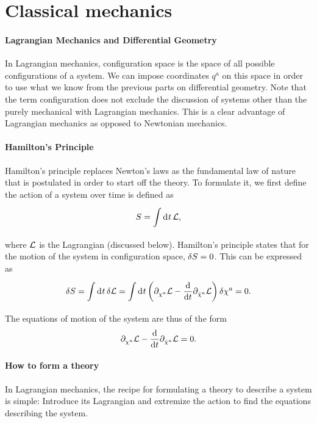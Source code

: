 \section{Classical mechanics}

\paragraph{Lagrangian Mechanics and Differential Geometry}
In Lagrangian mechanics, configuration space is the space of all possible configurations of a system. We can impose coordinates $q^{a}$ on this space in order to use what we know from the previous parts on differential geometry. Note that the term configuration does not exclude the discussion of systems other than the purely mechanical with Lagrangian mechanics. This is a clear advantage of Lagrangian mechanics as opposed to Newtonian mechanics.

\paragraph{Hamilton's Principle}
Hamilton's principle replaces Newton's laws as the fundamental law of nature that is postulated in order to start off the theory. To formulate it, we first define the action of a system over time is defined as
\begin{align*}
	S = \int\limits_{}^{}\dd[]{t}\mathcal{L},
\end{align*}
where $\mathcal{L}$ is the Lagrangian (discussed below). Hamilton's principle states that for the motion of the system in configuration space, $\delta S = 0$. This can be expressed as
\begin{align*}
	\delta S = \int\limits_{}^{}\dd[]{t}\delta \mathcal{L} = \int\limits_{}^{}\dd[]{t}\left(\partial^{}_{\chi^{a}}\mathcal{L} - \dv{t}\partial^{}_{\dot{\chi}^{a}}\mathcal{L}\right)\delta \chi^{a} = 0.
\end{align*}
The equations of motion of the system are thus of the form
\begin{align*}
	\partial^{}_{\chi^{a}}\mathcal{L} - \dv{t}\partial^{}_{\dot{\chi}^{a}}\mathcal{L} = 0.
\end{align*}

\paragraph{How to form a theory}
In Lagrangian mechanics, the recipe for formulating a theory to describe a system is simple: Introduce its Lagrangian and extremize the action to find the equations describing the system.

